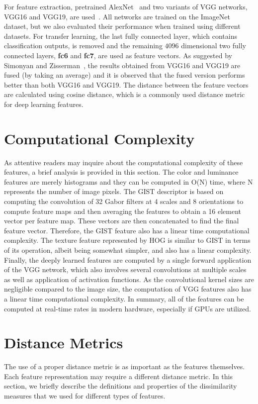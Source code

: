 For feature extraction, pretrained AlexNet~\cite{krizhevsky2012imagenet} and two variants of VGG networks, VGG16 and VGG19, are used~\cite{simonyan2014very}. All networks are trained on the ImageNet~\cite{russakovsky2015imagenet} dataset, but we also evaluated their performance when trained using different datasets. For transfer learning, the last fully connected layer, which contains classification outputs, is removed and the remaining $4096$ dimensional two fully connected layers, \textbf{fc6} and \textbf{fc7}, are used as feature vectors. As suggested by Simonyan and Zisserman~\cite{simonyan2014very}, the results obtained from VGG16 and VGG19 are fused (by taking an average) and it is observed that the fused version performs better than both VGG16 and VGG19. The distance between the feature vectors are calculated using cosine distance, which is a commonly used distance metric for deep learning features. 

\section{Computational Complexity}
As attentive readers may inquire about the computational complexity of these features, a brief analysis is provided in this section. The color and luminance features are merely histograms and they can be computed in O(N) time, where N represents the number of image pixels. The GIST descriptor is based on computing the convolution of 32 Gabor filters at 4 scales and 8 orientations to compute feature maps and then averaging the features to obtain a 16 element vector per feature map. These vectors are then concatenated to find the final feature vector. Therefore, the GIST feature also has a linear time computational complexity. The texture feature represented by HOG is similar to GIST in terms of its operation, albeit being somewhat simpler, and also has a linear complexity. Finally, the deeply learned features are computed by a single forward application of the VGG network, which also involves several convolutions at multiple scales as well as application of activation functions. As the convolutional kernel sizes are negligible compared to the image size, the computation of VGG features also has a linear time computational complexity. In summary, all of the features can be computed at real-time rates in modern hardware, especially if GPUs are utilized.

\section{Distance Metrics}
The use of a proper distance metric is as important as the features themselves. Each feature representation
may require a different distance metric. In this section, we briefly describe the definitions and properties of the dissimilarity measures that we used for different types of features.
